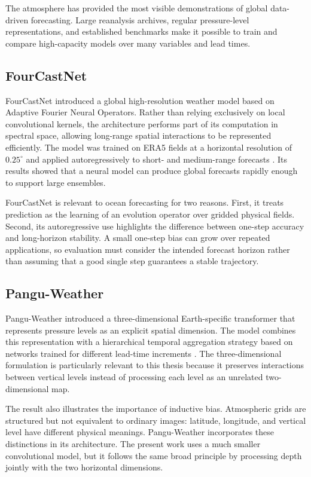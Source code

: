 The atmosphere has provided the most visible demonstrations of global data-driven forecasting. Large reanalysis archives, regular pressure-level representations, and established benchmarks make it possible to train and compare high-capacity models over many variables and lead times.

\subsection{FourCastNet}

FourCastNet introduced a global high-resolution weather model based on Adaptive Fourier Neural Operators. Rather than relying exclusively on local convolutional kernels, the architecture performs part of its computation in spectral space, allowing long-range spatial interactions to be represented efficiently. The model was trained on ERA5 fields at a horizontal resolution of $0.25^{\circ}$ and applied autoregressively to short- and medium-range forecasts \citep{pathak2022fourcastnet}. Its results showed that a neural model can produce global forecasts rapidly enough to support large ensembles.

FourCastNet is relevant to ocean forecasting for two reasons. First, it treats prediction as the learning of an evolution operator over gridded physical fields. Second, its autoregressive use highlights the difference between one-step accuracy and long-horizon stability. A small one-step bias can grow over repeated applications, so evaluation must consider the intended forecast horizon rather than assuming that a good single step guarantees a stable trajectory.

\subsection{Pangu-Weather}

Pangu-Weather introduced a three-dimensional Earth-specific transformer that represents pressure levels as an explicit spatial dimension. The model combines this representation with a hierarchical temporal aggregation strategy based on networks trained for different lead-time increments \citep{bi2023pangu}. The three-dimensional formulation is particularly relevant to this thesis because it preserves interactions between vertical levels instead of processing each level as an unrelated two-dimensional map.

The result also illustrates the importance of inductive bias. Atmospheric grids are structured but not equivalent to ordinary images: latitude, longitude, and vertical level have different physical meanings. Pangu-Weather incorporates these distinctions in its architecture. The present work uses a much smaller convolutional model, but it follows the same broad principle by processing depth jointly with the two horizontal dimensions.

